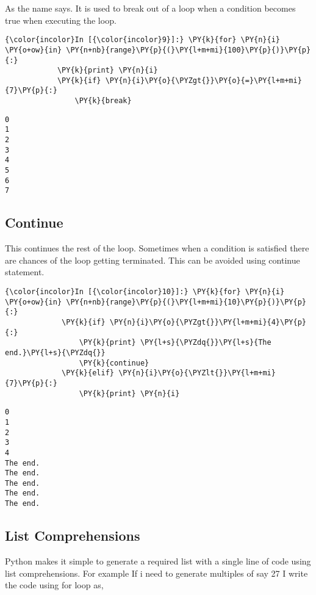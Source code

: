     As the name says. It is used to break out of a loop when a condition
becomes true when executing the loop.

    \begin{Verbatim}[commandchars=\\\{\}]
{\color{incolor}In [{\color{incolor}9}]:} \PY{k}{for} \PY{n}{i} \PY{o+ow}{in} \PY{n+nb}{range}\PY{p}{(}\PY{l+m+mi}{100}\PY{p}{)}\PY{p}{:}
            \PY{k}{print} \PY{n}{i}
            \PY{k}{if} \PY{n}{i}\PY{o}{\PYZgt{}}\PY{o}{=}\PY{l+m+mi}{7}\PY{p}{:}
                \PY{k}{break}
\end{Verbatim}

    \begin{Verbatim}[commandchars=\\\{\}]
0
1
2
3
4
5
6
7
    \end{Verbatim}

    \subsection{Continue}\label{continue}

    This continues the rest of the loop. Sometimes when a condition is
satisfied there are chances of the loop getting terminated. This can be
avoided using continue statement.

    \begin{Verbatim}[commandchars=\\\{\}]
{\color{incolor}In [{\color{incolor}10}]:} \PY{k}{for} \PY{n}{i} \PY{o+ow}{in} \PY{n+nb}{range}\PY{p}{(}\PY{l+m+mi}{10}\PY{p}{)}\PY{p}{:}
             \PY{k}{if} \PY{n}{i}\PY{o}{\PYZgt{}}\PY{l+m+mi}{4}\PY{p}{:}
                 \PY{k}{print} \PY{l+s}{\PYZdq{}}\PY{l+s}{The end.}\PY{l+s}{\PYZdq{}}
                 \PY{k}{continue}
             \PY{k}{elif} \PY{n}{i}\PY{o}{\PYZlt{}}\PY{l+m+mi}{7}\PY{p}{:}
                 \PY{k}{print} \PY{n}{i}
\end{Verbatim}

    \begin{Verbatim}[commandchars=\\\{\}]
0
1
2
3
4
The end.
The end.
The end.
The end.
The end.
    \end{Verbatim}

    \subsection{List Comprehensions}\label{list-comprehensions}

    Python makes it simple to generate a required list with a single line of
code using list comprehensions. For example If i need to generate
multiples of say 27 I write the code using for loop as,

